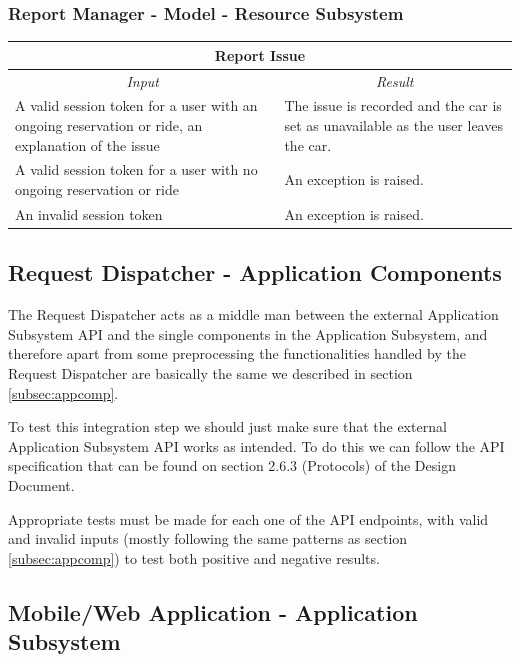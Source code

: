 \documentclass[english]{article}
\begin{document}
\subsubsection{Report Manager - Model - Resource Subsystem}

\begin{center}
	\begin{tabular}{ | p{6cm} | p{6cm} | }
		\hline 
		\multicolumn{2}{|c|}{\textbf{Report Issue}} \\
		\hline
		\multicolumn{1}{|c|}{\textit{Input}} & \multicolumn{1}{c|}{\textit{Result}} \\
		\hline
		A valid session token for a user with an ongoing reservation or ride, an explanation of the issue & The issue is recorded and the car is set as unavailable as the user leaves the car. \\
		\hline
		A valid session token for a user with no ongoing reservation or ride & An exception is raised. \\
		\hline
		An invalid session token & An exception is raised. \\
		\hline
	\end{tabular}
\end{center}


\subsection{Request Dispatcher - Application Components}

The Request Dispatcher acts as a middle man between the external Application Subsystem API and the single components in the Application Subsystem, and therefore apart from some preprocessing the functionalities handled by the Request Dispatcher are basically the same we described in section \ref{subsec:appcomp}.

To test this integration step we should just make sure that the external Application Subsystem API works as intended.
To do this we can follow the API specification that can be found on section 2.6.3 (Protocols) of the Design Document.

Appropriate tests must be made for each one of the API endpoints, with valid and invalid inputs (mostly following the same patterns as section \ref{subsec:appcomp}) to test both positive and negative results.

\subsection{Mobile/Web Application - Application Subsystem}
\end{document}
